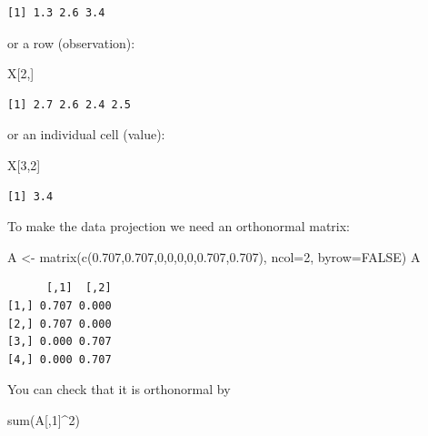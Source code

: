 \documentclass[
  letterpaper,
]{krantz}
\newenvironment{Shaded}{\begin{snugshade}}{\end{snugshade}}
\newcommand{\AttributeTok}[1]{\textcolor[rgb]{0.40,0.45,0.13}{#1}}
\newcommand{\ConstantTok}[1]{\textcolor[rgb]{0.56,0.35,0.01}{#1}}
\newcommand{\DecValTok}[1]{\textcolor[rgb]{0.68,0.00,0.00}{#1}}
\newcommand{\FloatTok}[1]{\textcolor[rgb]{0.68,0.00,0.00}{#1}}
\newcommand{\FunctionTok}[1]{\textcolor[rgb]{0.28,0.35,0.67}{#1}}
\newcommand{\NormalTok}[1]{\textcolor[rgb]{0.00,0.23,0.31}{#1}}
\newcommand{\OtherTok}[1]{\textcolor[rgb]{0.00,0.23,0.31}{#1}}
\newcommand{\SpecialCharTok}[1]{\textcolor[rgb]{0.37,0.37,0.37}{#1}}
\begin{document}
\begin{verbatim}
[1] 1.3 2.6 3.4
\end{verbatim}

or a row (observation):

\begin{Shaded}
\begin{Highlighting}[]
\NormalTok{X[}\DecValTok{2}\NormalTok{,]}
\end{Highlighting}
\end{Shaded}

\begin{verbatim}
[1] 2.7 2.6 2.4 2.5
\end{verbatim}

or an individual cell (value):

\begin{Shaded}
\begin{Highlighting}[]
\NormalTok{X[}\DecValTok{3}\NormalTok{,}\DecValTok{2}\NormalTok{]}
\end{Highlighting}
\end{Shaded}

\begin{verbatim}
[1] 3.4
\end{verbatim}

To make the data projection we need an orthonormal matrix:

\begin{Shaded}
\begin{Highlighting}[]
\NormalTok{A }\OtherTok{\textless{}{-}} \FunctionTok{matrix}\NormalTok{(}\FunctionTok{c}\NormalTok{(}\FloatTok{0.707}\NormalTok{,}\FloatTok{0.707}\NormalTok{,}\DecValTok{0}\NormalTok{,}\DecValTok{0}\NormalTok{,}\DecValTok{0}\NormalTok{,}\DecValTok{0}\NormalTok{,}\FloatTok{0.707}\NormalTok{,}\FloatTok{0.707}\NormalTok{), }\AttributeTok{ncol=}\DecValTok{2}\NormalTok{, }\AttributeTok{byrow=}\ConstantTok{FALSE}\NormalTok{)}
\NormalTok{A}
\end{Highlighting}
\end{Shaded}

\begin{verbatim}
      [,1]  [,2]
[1,] 0.707 0.000
[2,] 0.707 0.000
[3,] 0.000 0.707
[4,] 0.000 0.707
\end{verbatim}

You can check that it is orthonormal by

\begin{Shaded}
\begin{Highlighting}[]
\FunctionTok{sum}\NormalTok{(A[,}\DecValTok{1}\NormalTok{]}\SpecialCharTok{\^{}}\DecValTok{2}\NormalTok{)}
\end{Highlighting}
\end{Shaded}
\end{document}
